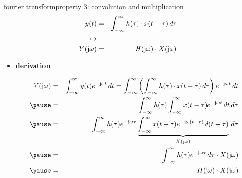         \begin{frame}{fourier transform}{property 3: convolution and multiplication}
            \vspace{-5mm}
            \begin{eqnarray*}
                y(t) &=& \int_{-\infty}^{\infty} {h(\tau) \cdot x(t-\tau)\, d\tau}\\\mapsto &&\\
                Y(\mathrm{j}\omega) &=& H(\mathrm{j}\omega)\cdot X(\mathrm{j}\omega) \nonumber
            \end{eqnarray*}
            
            \pause
            \vspace{-2mm}
            \begin{itemize}
                \item[]	\textbf{derivation}
                        \begin{footnotesize}
                    \begin{eqnarray*}
                        Y(\jom)	&=& \int_{-\infty}^{\infty} {y(t) \e^{-\jom t}\, dt} = \int_{-\infty}^{\infty} {\left(\int_{-\infty}^{\infty} {h(\tau) \cdot x(t-\tau)\, d\tau}\right) \e^{-\jom t}\, dt}\nonumber\\
                                \pause
                                    &=& \int_{-\infty}^{\infty} {h(\tau) \int_{-\infty}^{\infty} {x(t-\tau)} \e^{-\jom t}\, dt\, d\tau}\nonumber\\
                                \pause
                                    &=& \int_{-\infty}^{\infty} {h(\tau)  \e^{-\jom \tau} \underbrace{\int_{-\infty}^{\infty} {x(t-\tau)} \e^{-\jom (t-\tau)}\, d(t-\tau)}_{X(\jom)}\, d\tau}\nonumber\\
                                \pause
                                    &=& \int_{-\infty}^{\infty} {h(\tau) \e^{-\jom \tau}\, d\tau} \cdot X(\jom)\nonumber\\
                                \pause
                                    &=& H(\jom) \cdot X(\jom)\label{eq:mult_conv} 
                    \end{eqnarray*}
                        \end{footnotesize}
            \end{itemize}
        \end{frame}	

